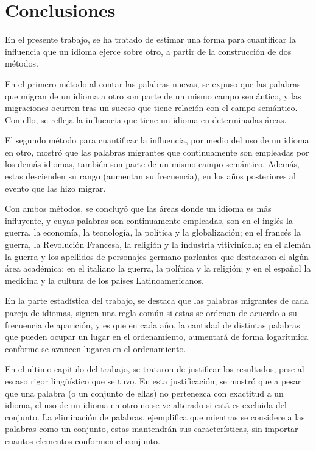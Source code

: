 \chapter{Conclusiones}

En el presente trabajo, se ha tratado de estimar una forma para cuantificar la influencia que un idioma ejerce sobre otro,  a partir de la construcción de dos métodos. 

En el primero método al contar las palabras nuevas, se expuso que las palabras que migran de un idioma a otro son parte de un mismo campo semántico, y las migraciones ocurren tras un suceso que tiene relación con el campo semántico. Con ello, se refleja la influencia que tiene un idioma en determinadas áreas.  

El segundo método para cuantificar la influencia, por medio del uso de un idioma en otro, mostró que las palabras migrantes que continuamente son empleadas por los demás idiomas, también son parte de un mismo campo semántico. Además, estas descienden su rango (aumentan su frecuencia), en los años posteriores al evento que las hizo migrar. 

Con ambos métodos, se concluyó que las áreas donde un idioma es más influyente, y cuyas palabras son continuamente empleadas, son en el inglés la guerra, la economía, la tecnología, la política y la globalización; en el francés la guerra, la Revolución Francesa, la religión y la industria vitivinícola; en el alemán la guerra y los apellidos de personajes germano parlantes que destacaron el algún área académica; en el italiano  la guerra, la política y la religión; y en el español la medicina y la cultura de los países Latinoamericanos. 


En la parte estadística del trabajo, se destaca que las palabras migrantes de cada pareja de idiomas, siguen una regla común si estas se ordenan de acuerdo a su frecuencia de aparición, y es que en cada año, la cantidad de distintas palabras que pueden ocupar un lugar en el ordenamiento, aumentará de forma logarítmica conforme se avancen lugares en el ordenamiento. 

En el ultimo capitulo del trabajo, se trataron de justificar los resultados, pese al escaso rigor lingüístico que se tuvo. En esta justificación, se mostró que a pesar que una palabra (o un conjunto de ellas) no pertenezca con exactitud a un idioma,  el uso de un idioma en otro no se ve alterado si está es excluida del conjunto. La eliminación de palabras, ejemplifica que mientras se considere a las palabras como un conjunto,  estas mantendrán sus características, sin importar cuantos elementos conformen el conjunto. 





